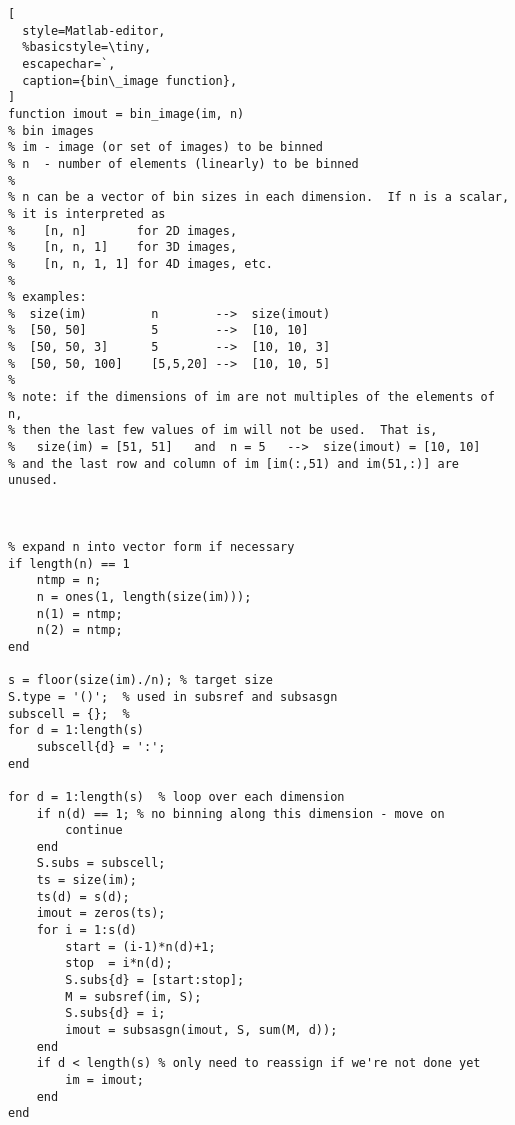 \begin{lstlisting}[
  style=Matlab-editor,
  %basicstyle=\tiny,
  escapechar=`,
  caption={bin\_image function},
]
function imout = bin_image(im, n)
% bin images
% im - image (or set of images) to be binned
% n  - number of elements (linearly) to be binned
%
% n can be a vector of bin sizes in each dimension.  If n is a scalar,
% it is interpreted as 
%    [n, n]       for 2D images, 
%    [n, n, 1]    for 3D images,
%    [n, n, 1, 1] for 4D images, etc.
%
% examples:
%  size(im)         n        -->  size(imout)
%  [50, 50]         5        -->  [10, 10]
%  [50, 50, 3]      5        -->  [10, 10, 3]
%  [50, 50, 100]    [5,5,20] -->  [10, 10, 5]
%
% note: if the dimensions of im are not multiples of the elements of n,
% then the last few values of im will not be used.  That is,
%   size(im) = [51, 51]   and  n = 5   -->  size(imout) = [10, 10]
% and the last row and column of im [im(:,51) and im(51,:)] are unused.



% expand n into vector form if necessary
if length(n) == 1
    ntmp = n;
    n = ones(1, length(size(im)));
    n(1) = ntmp;
    n(2) = ntmp;
end

s = floor(size(im)./n); % target size
S.type = '()';  % used in subsref and subsasgn
subscell = {};  %
for d = 1:length(s)
    subscell{d} = ':';
end

for d = 1:length(s)  % loop over each dimension
    if n(d) == 1; % no binning along this dimension - move on
        continue
    end
    S.subs = subscell;
    ts = size(im);
    ts(d) = s(d);
    imout = zeros(ts);
    for i = 1:s(d)
        start = (i-1)*n(d)+1;
        stop  = i*n(d);
        S.subs{d} = [start:stop];
        M = subsref(im, S);
        S.subs{d} = i;
        imout = subsasgn(imout, S, sum(M, d));
    end
    if d < length(s) % only need to reassign if we're not done yet
        im = imout;
    end
end

\end{lstlisting}